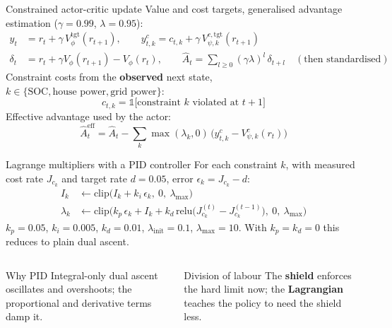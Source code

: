 \documentclass[aspectratio=169,10pt]{beamer}
\begin{document}
\begin{frame}{Constrained actor-critic update}
Value and cost targets, generalised advantage estimation ($\gamma = 0.99$, $\lambda = 0.95$):
\begin{align*}
y_t &= r_t + \gamma\, V^{\text{tgt}}_\phi(r_{t+1}), \qquad y^c_{t,k} = c_{t,k} + \gamma\, V^{c,\text{tgt}}_{\psi,k}(r_{t+1})\\
\delta_t &= r_t + \gamma V_\phi(r_{t+1}) - V_\phi(r_t), \qquad \hat A_t = \textstyle\sum_{l \ge 0} (\gamma\lambda)^l\, \delta_{t+l} \quad(\text{then standardised})
\end{align*}
Constraint costs from the \textbf{observed} next state, $k \in \{\text{SOC}, \text{house power}, \text{grid power}\}$:
\[
c_{t,k} = \mathbb 1\big[\text{constraint } k \text{ violated at } t+1\big]
\]
Effective advantage used by the actor:
\[
\hat A^{\text{eff}}_t = \hat A_t - \sum_k \max(\lambda_k, 0)\,\big(y^c_{t,k} - V^c_{\psi,k}(r_t)\big)
\]
\end{frame}

\begin{frame}{Lagrange multipliers with a PID controller}
For each constraint $k$, with measured cost rate $J_{c_k}$ and target rate $d = 0.05$, error $\epsilon_k = J_{c_k} - d$:
\begin{align*}
I_k &\leftarrow \mathrm{clip}\big(I_k + k_i\,\epsilon_k,\ 0,\ \lambda_{\max}\big)\\
\lambda_k &\leftarrow \mathrm{clip}\Big(k_p\,\epsilon_k + I_k + k_d\,\mathrm{relu}\big(J^{(t)}_{c_k} - J^{(t-1)}_{c_k}\big),\ 0,\ \lambda_{\max}\Big)
\end{align*}
\small $k_p = 0.05$, $k_i = 0.005$, $k_d = 0.01$, $\lambda_{\text{init}} = 0.1$, $\lambda_{\max} = 10$. With $k_p = k_d = 0$ this reduces to plain dual ascent.
\vspace{0.4em}
\begin{columns}[T]
\begin{block}{Why PID}
Integral-only dual ascent oscillates and overshoots; the proportional and derivative terms damp it.
\end{block}
\begin{block}{Division of labour}
The \textbf{shield} enforces the hard limit now; the \textbf{Lagrangian} teaches the policy to need the shield less.
\end{block}
\end{columns}
\end{frame}
\end{document}
